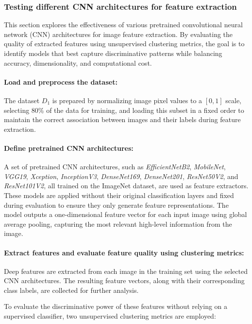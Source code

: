 \subsubsection{Testing different CNN architectures for feature extraction}
This section explores the effectiveness of various pretrained convolutional neural network (CNN) architectures for image feature extraction. By evaluating the quality of extracted features using unsupervised clustering metrics, the goal is to identify models that best capture discriminative patterns while balancing accuracy, dimensionality, and computational cost.

\paragraph{Load and preprocess the dataset:}  
The dataset $D_1$ is prepared by normalizing image pixel values to a $[0, 1]$ scale, selecting 80\% of the data for training, and loading this subset in a fixed order to maintain the correct association between images and their labels during feature extraction.

\paragraph{Define pretrained CNN architectures:}  
A set of pretrained CNN architectures, such as \textit{EfficientNetB2}, \textit{MobileNet}, \textit{VGG19}, \textit{Xception}, \textit{InceptionV3}, \textit{DenseNet169}, \textit{DenseNet201}, \textit{ResNet50V2}, and \textit{ResNet101V2}, all trained on the ImageNet dataset, are used as feature extractors. These models are applied without their original classification layers and fixed during evaluation to ensure they only generate feature representations. The model outputs a one-dimensional feature vector for each input image using global average pooling, capturing the most relevant high-level information from the image.

\paragraph{Extract features and evaluate feature quality using clustering metrics:}  
Deep features are extracted from each image in the training set using the selected CNN architectures. The resulting feature vectors, along with their corresponding class labels, are collected for further analysis.

To evaluate the discriminative power of these features without relying on a supervised classifier, two unsupervised clustering metrics are employed:

